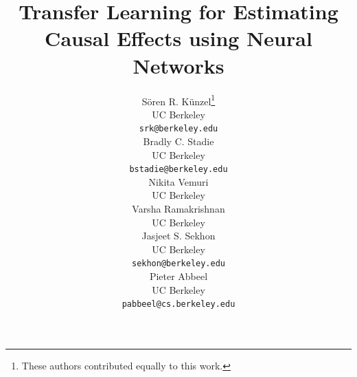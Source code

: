 \documentclass{article}
\title{Transfer Learning for Estimating Causal Effects using Neural Networks}
\author{
	Sören R. Künzel\thanks{These authors contributed equally to this work.} \\
	UC Berkeley\\
	\texttt{srk@berkeley.edu} \\
	\And
	Bradly C. Stadie\samethanks \\
	UC Berkeley\\
	\texttt{bstadie@berkeley.edu} \\
	\And	
	Nikita Vemuri \\
	UC Berkeley \\
	\AND
	Varsha Ramakrishnan \\
	UC Berkeley \\
	\And
	Jasjeet S. Sekhon \\ %
	UC Berkeley \\
	\texttt{sekhon@berkeley.edu} \\
	\And
    Pieter Abbeel \\
	UC Berkeley \\
	\texttt{pabbeel@cs.berkeley.edu} \\
}
\begin{document}
	\maketitle
	\begin{abstract}
		
	\end{abstract}
	
	
	
	
	
    

	

	\clearpage
	
	
	
	
    \clearpage

    \appendix
    \clearpage
    
    
    
	\clearpage
    
	
    \clearpage
	
	
\end{document}

